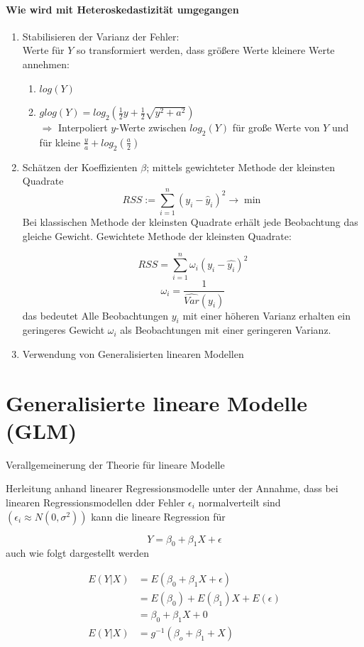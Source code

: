 \paragraph{Wie wird mit Heteroskedastizität umgegangen}
\begin{enumerate}
	\item Stabilisieren der Varianz der Fehler:\\
		Werte für $Y$ so transformiert werden, dass größere Werte kleinere Werte annehmen:
		\begin{enumerate}
			\item $log(Y)$
			\item $glog(Y) = log_{2}(\frac{1}{2} y + \frac{1}{2}\sqrt{y^{2} + a^{2}} ) $ \\
				$\Rightarrow$ Interpoliert $y$-Werte zwischen $log_2(Y)$ für große Werte von $Y$ und für kleine $\frac{y}{a} + log_2(\frac{a}{2})$
		\end{enumerate}
	\item Schätzen der Koeffizienten \(\beta\); mittels gewichteter Methode der kleinsten Quadrate
		\[ RSS := \sum_{i=1}^{n}(y_i - \hat{y}_i)^2 \rightarrow \min \]
		Bei klassischen Methode der kleinsten Quadrate erhält jede Beobachtung das gleiche Gewicht.
		Gewichtete Methode der kleinsten Quadrate:

		\[ RSS = \sum_{i = 1}^{n}\omega_i (y_i - \widehat{y_i})^2 \]
		\[ \omega_i = \dfrac{1}{\hat{Var}(y_i)} \]
		das bedeutet Alle Beobachtungen \(y_i\) mit einer höheren Varianz erhalten ein geringeres Gewicht \(\omega_i\) als Beobachtungen mit einer geringeren Varianz.  
	\item Verwendung von Generalisierten linearen Modellen
\end{enumerate}

\section{Generalisierte lineare Modelle (GLM)}
Verallgemeinerung der Theorie für lineare Modelle

Herleitung anhand linearer Regressionsmodelle
unter der Annahme, dass bei linearen Regressionsmodellen dder Fehler \( \epsilon_i\) normalverteilt sind \((\epsilon_i \approx N(0, \sigma^2))\) kann die lineare Regression für

\[ Y = \beta_0 + \beta_1 X + \epsilon \]
auch wie folgt dargestellt werden

\begin{align*}
E(Y|X) &= E(\beta_0 + \beta_1 X + \epsilon)\\
&=  E(\beta_0) + E(\beta_1) X + E(\epsilon)\\
&= \beta_0 + \beta_1 X + 0\\
E(Y|X) &= g^{-1} (\beta_o + \beta_1 + X)
\end{align*}

